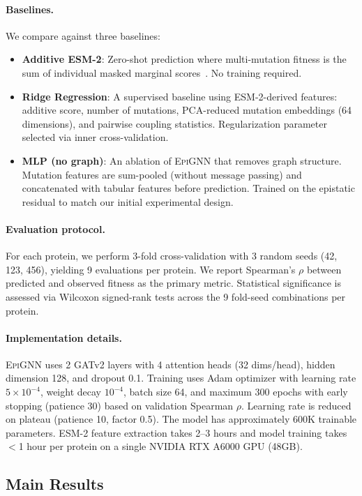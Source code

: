 \documentclass{article}
\newcommand{\epignn}{\textsc{EpiGNN}}
\begin{document}
\paragraph{Baselines.}
We compare against three baselines:
\begin{itemize}
    \item \textbf{Additive ESM-2}: Zero-shot prediction where multi-mutation fitness is the sum of individual masked marginal scores~\citep{meier2021language}. No training required.
    \item \textbf{Ridge Regression}: A supervised baseline using ESM-2-derived features: additive score, number of mutations, PCA-reduced mutation embeddings (64 dimensions), and pairwise coupling statistics. Regularization parameter selected via inner cross-validation.
    \item \textbf{MLP (no graph)}: An ablation of \epignn{} that removes graph structure. Mutation features are sum-pooled (without message passing) and concatenated with tabular features before prediction. Trained on the epistatic residual to match our initial experimental design.
\end{itemize}

\paragraph{Evaluation protocol.}
For each protein, we perform 3-fold cross-validation with 3 random seeds (42, 123, 456), yielding 9 evaluations per protein.
We report Spearman's $\rho$ between predicted and observed fitness as the primary metric.
Statistical significance is assessed via Wilcoxon signed-rank tests across the 9 fold-seed combinations per protein.

\paragraph{Implementation details.}
\epignn{} uses 2 GATv2 layers with 4 attention heads (32 dims/head), hidden dimension 128, and dropout 0.1.
Training uses Adam optimizer with learning rate $5 \times 10^{-4}$, weight decay $10^{-4}$, batch size 64, and maximum 300 epochs with early stopping (patience 30) based on validation Spearman $\rho$.
Learning rate is reduced on plateau (patience 10, factor 0.5).
The model has approximately 600K trainable parameters.
ESM-2 feature extraction takes 2--3 hours and model training takes $<$1 hour per protein on a single NVIDIA RTX A6000 GPU (48GB).

\subsection{Main Results}
\end{document}
